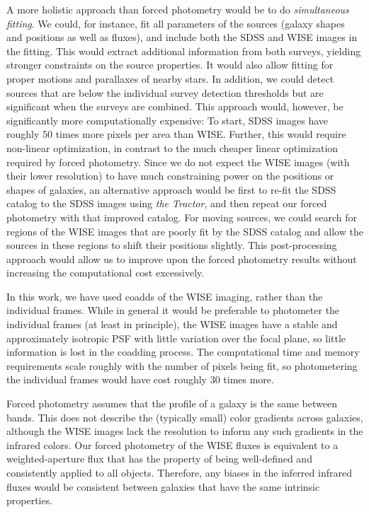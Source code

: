 \documentclass[12pt,preprint]{aastex}
\newcommand{\thetractor}{\textsl{the Tractor}}
\begin{document}
A more holistic approach than forced photometry would be to do
\emph{simultaneous fitting}.  We could, for instance, fit all
parameters of the sources (galaxy shapes and positions as well as
fluxes), and include both the SDSS and WISE images in the fitting.
This would extract additional information from both surveys, yielding
stronger constraints on the source properties.  It would also allow
fitting for proper motions and parallaxes of nearby stars.  In
addition, we could detect sources that are below the individual survey
detection thresholds but are significant when the surveys are
combined.  This approach would, however, be significantly more
computationally expensive: To start, SDSS images have roughly 50 times
more pixels per area than WISE.  Further, this would require
non-linear optimization, in contrast to the much cheaper linear
optimization required by forced photometry.  Since we do not expect
the WISE images (with their lower resolution) to have much
constraining power on the positions or shapes of galaxies, an
alternative approach would be first to re-fit the SDSS catalog to the
SDSS images using \thetractor, and then repeat our forced photometry
with that improved catalog.  For moving sources, we could search for
regions of the WISE images that are poorly fit by the SDSS catalog and
allow the sources in these regions to shift their positions slightly.
This post-processing approach would allow us to improve upon the
forced photometry results without increasing the computational cost
excessively.


In this work, we have used coadds of the WISE imaging, rather than the
individual frames.  While in general it would be preferable to
photometer the individual frames (at least in principle), the WISE
images have a stable and approximately isotropic PSF with little
variation over the focal plane, so little information is lost in the
coadding process.  The computational time and memory requirements
scale roughly with the number of pixels being fit, so photometering
the individual frames would have cost roughly 30 times more.

Forced photometry assumes that the profile of a galaxy is the same
between bands.  This does not describe the (typically small) color
gradients across galaxies, although the WISE images lack the
resolution to inform any such gradients in the infrared colors.  Our
forced photometry of the WISE fluxes is equivalent to a
weighted-aperture flux that has the property of being well-defined and
consistently applied to all objects.  Therefore, any biases in the
inferred infrared fluxes would be consistent between galaxies that
have the same intrinsic properties.
\end{document}
